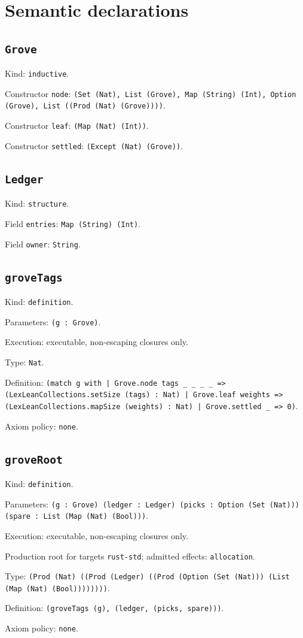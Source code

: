 \documentclass[11pt]{article}
\begin{document}
\section*{Semantic declarations}
\subsection*{\texttt{Grove}}
\noindent Kind: \texttt{inductive}.\par
\noindent Constructor \texttt{node}: \texttt{(Set (Nat), List (Grove), Map (String) (Int), Option (Grove), List ((Prod (Nat) (Grove))))}.\par
\noindent Constructor \texttt{leaf}: \texttt{(Map (Nat) (Int))}.\par
\noindent Constructor \texttt{settled}: \texttt{(Except (Nat) (Grove))}.\par
\subsection*{\texttt{Ledger}}
\noindent Kind: \texttt{structure}.\par
\noindent Field \texttt{entries}: \texttt{Map (String) (Int)}.\par
\noindent Field \texttt{owner}: \texttt{String}.\par
\subsection*{\texttt{groveTags}}
\noindent Kind: \texttt{definition}.\par
\noindent Parameters: \texttt{(g : Grove)}.\par
\noindent Execution: executable, non-escaping closures only.\par
\noindent Type: \texttt{Nat}.\par
\noindent Definition: \texttt{(match g with | Grove.node tags \_ \_ \_ \_ => (LexLeanCollections.setSize (tags) : Nat) | Grove.leaf weights => (LexLeanCollections.mapSize (weights) : Nat) | Grove.settled \_ => 0)}.\par
\noindent Axiom policy: \texttt{none}.\par
\subsection*{\texttt{groveRoot}}
\noindent Kind: \texttt{definition}.\par
\noindent Parameters: \texttt{(g : Grove) (ledger : Ledger) (picks : Option (Set (Nat))) (spare : List (Map (Nat) (Bool)))}.\par
\noindent Execution: executable, non-escaping closures only.\par
\noindent Production root for targets \texttt{rust-std}; admitted effects: \texttt{allocation}.\par
\noindent Type: \texttt{(Prod (Nat) ((Prod (Ledger) ((Prod (Option (Set (Nat))) (List (Map (Nat) (Bool))))))))}.\par
\noindent Definition: \texttt{(groveTags (g), (ledger, (picks, spare)))}.\par
\noindent Axiom policy: \texttt{none}.\par
\end{document}
